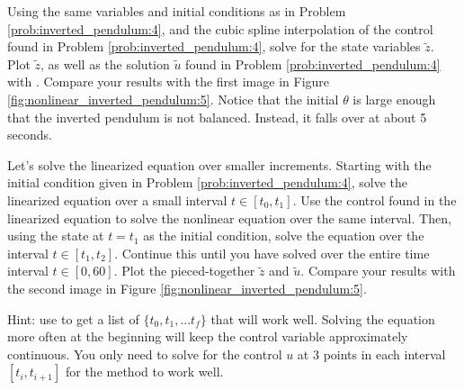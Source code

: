 \begin{problem}
Using the same variables and initial conditions as in Problem \ref{prob:inverted_pendulum:4}, and the cubic spline interpolation of the control found in Problem \ref{prob:inverted_pendulum:4}, solve for the state variables $\tilde{z}$. Plot $\tilde{z}$, as well as the solution $\tilde{u}$ found in Problem \ref{prob:inverted_pendulum:4} with . Compare your results with the first image in Figure \ref{fig:nonlinear_inverted_pendulum:5}.
Notice that the initial $\theta$ is large enough that the inverted pendulum is not balanced. Instead, it falls over at about 5 seconds.


Let's solve the linearized equation over smaller increments. Starting with the initial condition given in Problem \ref{prob:inverted_pendulum:4}, solve the linearized equation over a small interval $t\in[t_0,t_1]$. Use the control found in the linearized equation to solve the nonlinear equation over the same interval. Then, using the state at $t=t_1$ as the initial condition, solve the equation over the interval $t\in[t_1,t_2]$. Continue this until you have solved over the entire time interval $t\in[0,60]$. Plot the pieced-together $\tilde{z}$ and $\tilde{u}$. Compare your results with the second image in Figure \ref{fig:nonlinear_inverted_pendulum:5}.

Hint: use  to get a list of $\{t_0, t_1, ... t_f\}$ that will work well. Solving the equation more often at the beginning will keep the control variable approximately continuous. You only need to solve for the control $u$ at 3 points in each interval $[t_i, t_{i+1}]$ for the method to work well.

\label{prob:inverted_pendulum:5}
\end{problem}


